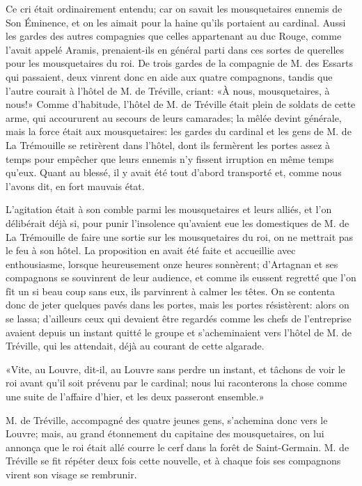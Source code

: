 Ce cri était ordinairement entendu; car on savait les mousquetaires ennemis de Son Éminence, et on les aimait pour la haine qu'ils portaient au cardinal. Aussi les gardes des autres compagnies que celles appartenant au duc Rouge, comme l'avait appelé Aramis, prenaient-ils en général parti dans ces sortes de querelles pour les mousquetaires du roi. De trois gardes de la compagnie de M. des Essarts qui passaient, deux vinrent donc en aide aux quatre compagnons, tandis que l'autre courait à l'hôtel de M. de Tréville, criant: «À nous, mousquetaires, à nous!» Comme d'habitude, l'hôtel de M. de Tréville était plein de soldats de cette arme, qui accoururent au secours de leurs camarades; la mêlée devint générale, mais la force était aux mousquetaires: les gardes du cardinal et les gens de M. de La Trémouille se retirèrent dans l'hôtel, dont ils fermèrent les portes assez à temps pour empêcher que leurs ennemis n'y fissent irruption en même temps qu'eux. Quant au blessé, il y avait été tout d'abord transporté et, comme nous l'avons dit, en fort mauvais état. 

L'agitation était à son comble parmi les mousquetaires et leurs alliés, et l'on délibérait déjà si, pour punir l'insolence qu'avaient eue les domestiques de M. de La Trémouille de faire une sortie sur les mousquetaires du roi, on ne mettrait pas le feu à son hôtel. La proposition en avait été faite et accueillie avec enthousiasme, lorsque heureusement onze heures sonnèrent; d'Artagnan et ses compagnons se souvinrent de leur audience, et comme ils eussent regretté que l'on fît un si beau coup sans eux, ils parvinrent à calmer les têtes. On se contenta donc de jeter quelques pavés dans les portes, mais les portes résistèrent: alors on se lassa; d'ailleurs ceux qui devaient être regardés comme les chefs de l'entreprise avaient depuis un instant quitté le groupe et s'acheminaient vers l'hôtel de M. de Tréville, qui les attendait, déjà au courant de cette algarade. 

«Vite, au Louvre, dit-il, au Louvre sans perdre un instant, et tâchons de voir le roi avant qu'il soit prévenu par le cardinal; nous lui raconterons la chose comme une suite de l'affaire d'hier, et les deux passeront ensemble.» 

M. de Tréville, accompagné des quatre jeunes gens, s'achemina donc vers le Louvre; mais, au grand étonnement du capitaine des mousquetaires, on lui annonça que le roi était allé courre le cerf dans la forêt de Saint-Germain. M. de Tréville se fit répéter deux fois cette nouvelle, et à chaque fois ses compagnons virent son visage se rembrunir. 

